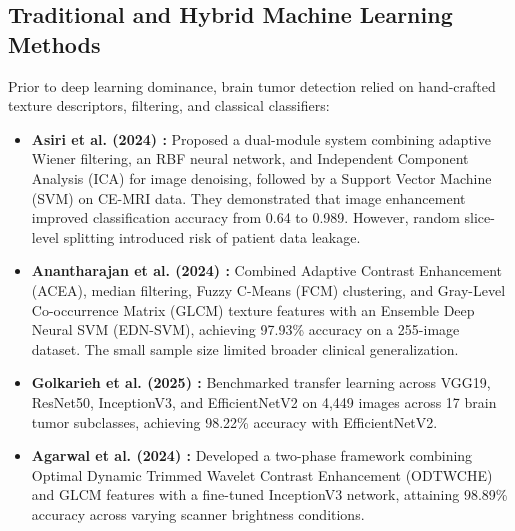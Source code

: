 \documentclass[12pt, a4paper]{article}
\begin{document}
\subsection{Traditional and Hybrid Machine Learning Methods}
Prior to deep learning dominance, brain tumor detection relied on hand-crafted texture descriptors, filtering, and classical classifiers:
\begin{itemize}[leftmargin=*, itemsep=4pt]
    \item \textbf{Asiri et al. (2024) \cite{asiri2024optimized}:} Proposed a dual-module system combining adaptive Wiener filtering, an RBF neural network, and Independent Component Analysis (ICA) for image denoising, followed by a Support Vector Machine (SVM) on CE-MRI data. They demonstrated that image enhancement improved classification accuracy from 0.64 to 0.989. However, random slice-level splitting introduced risk of patient data leakage.
    \item \textbf{Anantharajan et al. (2024) \cite{anantharajan2024mri}:} Combined Adaptive Contrast Enhancement (ACEA), median filtering, Fuzzy C-Means (FCM) clustering, and Gray-Level Co-occurrence Matrix (GLCM) texture features with an Ensemble Deep Neural SVM (EDN-SVM), achieving 97.93\% accuracy on a 255-image dataset. The small sample size limited broader clinical generalization.
    \item \textbf{Golkarieh et al. (2025) \cite{golkarieh2025breakthroughs}:} Benchmarked transfer learning across VGG19, ResNet50, InceptionV3, and EfficientNetV2 on 4,449 images across 17 brain tumor subclasses, achieving 98.22\% accuracy with EfficientNetV2.
    \item \textbf{Agarwal et al. (2024) \cite{agarwal2024deep}:} Developed a two-phase framework combining Optimal Dynamic Trimmed Wavelet Contrast Enhancement (ODTWCHE) and GLCM features with a fine-tuned InceptionV3 network, attaining 98.89\% accuracy across varying scanner brightness conditions.
\end{itemize}
\end{document}
